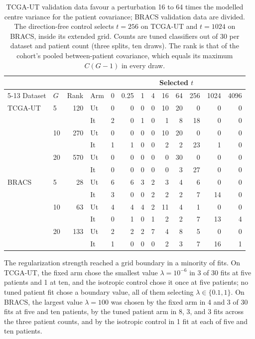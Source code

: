 \begin{table}[htbp]
\centering
\small
\setlength{\tabcolsep}{4pt}
\renewcommand{\arraystretch}{1.15}
\begin{tabular}{@{}llrlrrrrrrrrr@{}}
\toprule
 & & & & \multicolumn{9}{c}{Selected $t$} \\
\cmidrule(lr){5-13}
Dataset & $G$ & Rank & Arm & 0 & 0.25 & 1 & 4 & 16 & 64 & 256 & 1024 & 4096 \\
\midrule
TCGA-UT & 5 & 120 & Ut & 0 & 0 & 0 & 0 & 10 & 20 & 0 & 0 & 0 \\
        &   &     & It & 2 & 0 & 1 & 0 & 1 & 8 & 18 & 0 & 0 \\
        & 10 & 270 & Ut & 0 & 0 & 0 & 0 & 10 & 20 & 0 & 0 & 0 \\
        &   &     & It & 1 & 1 & 0 & 0 & 2 & 2 & 23 & 1 & 0 \\
        & 20 & 570 & Ut & 0 & 0 & 0 & 0 & 0 & 30 & 0 & 0 & 0 \\
        &   &     & It & 0 & 0 & 0 & 0 & 0 & 3 & 27 & 0 & 0 \\
\addlinespace
BRACS & 5 & 28 & Ut & 6 & 6 & 3 & 2 & 3 & 4 & 6 & 0 & 0 \\
      &   &    & It & 3 & 0 & 0 & 2 & 2 & 2 & 7 & 14 & 0 \\
      & 10 & 63 & Ut & 4 & 4 & 4 & 2 & 11 & 4 & 1 & 0 & 0 \\
      &   &     & It & 0 & 1 & 0 & 1 & 2 & 2 & 7 & 13 & 4 \\
      & 20 & 133 & Ut & 2 & 2 & 2 & 7 & 4 & 8 & 5 & 0 & 0 \\
      &   &      & It & 1 & 0 & 0 & 0 & 2 & 3 & 7 & 16 & 1 \\
\bottomrule
\end{tabular}
\caption{TCGA-UT validation data favour a perturbation 16 to 64 times the modelled centre variance for the patient covariance; BRACS validation data are divided. The direction-free control selects $t=256$ on TCGA-UT and $t=1024$ on BRACS, inside its extended grid. Counts are tuned classifiers out of 30 per dataset and patient count (three splits, ten draws). The rank is that of the cohort's pooled between-patient covariance, which equals its maximum $C(G-1)$ in every draw.}
\label{tab:selection}
\end{table}

\noindent The regularization strength reached a grid boundary in a minority of fits. On TCGA-UT, the fixed arm chose the smallest value $\lambda=10^{-6}$ in 3 of 30 fits at five patients and 1 at ten, and the isotropic control chose it once at five patients; no tuned patient fit chose a boundary value, all of them selecting $\lambda\in\{0.1,1\}$. On BRACS, the largest value $\lambda=100$ was chosen by the fixed arm in 4 and 3 of 30 fits at five and ten patients, by the tuned patient arm in 8, 3, and 3 fits across the three patient counts, and by the isotropic control in 1 fit at each of five and ten patients.

